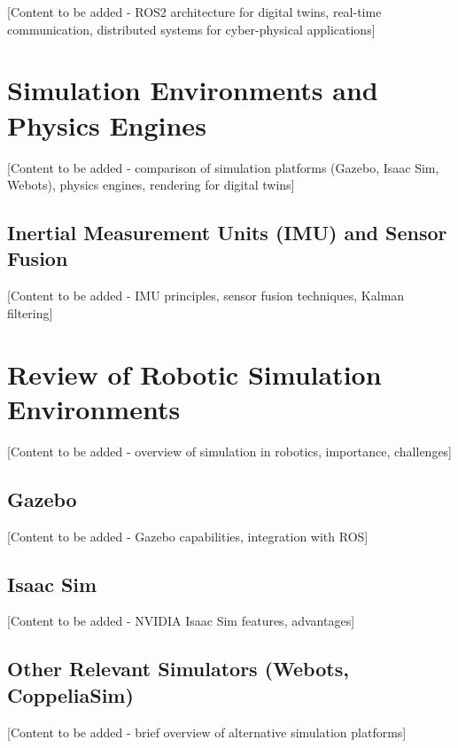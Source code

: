 [Content to be added - ROS2 architecture for digital twins, real-time communication, distributed systems for cyber-physical applications]

\section{Simulation Environments and Physics Engines}

[Content to be added - comparison of simulation platforms (Gazebo, Isaac Sim, Webots), physics engines, rendering for digital twins]

\subsection{Inertial Measurement Units (IMU) and Sensor Fusion}

[Content to be added - IMU principles, sensor fusion techniques, Kalman filtering]

\section{Review of Robotic Simulation Environments}

[Content to be added - overview of simulation in robotics, importance, challenges]

\subsection{Gazebo}

[Content to be added - Gazebo capabilities, integration with ROS]

\subsection{Isaac Sim}

[Content to be added - NVIDIA Isaac Sim features, advantages]

\subsection{Other Relevant Simulators (Webots, CoppeliaSim)}

[Content to be added - brief overview of alternative simulation platforms]
